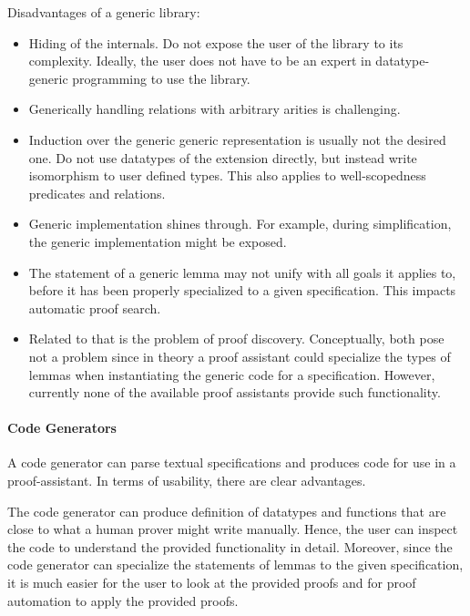 Disadvantages of a generic library:
\begin{itemize}
\item Hiding of the internals. Do not expose the user of the library
  to its complexity. Ideally, the user does not have to be an expert
  in datatype-generic programming to use the library.

\item Generically handling relations with arbitrary arities is challenging.

\item Induction over the generic generic representation is usually not the
  desired one. Do not use datatypes of the extension directly, but instead write
  isomorphism to user defined types. This also applies to well-scopedness
  predicates and relations.

\item Generic implementation shines through. For example, during
  simplification, the generic implementation might be exposed.

\item The statement of a generic lemma may not unify with all goals it applies
  to, before it has been properly specialized to a given specification. This
  impacts automatic proof search.

\item Related to that is the problem of proof discovery. Conceptually, both pose
  not a problem since in theory a proof assistant could specialize the types of
  lemmas when instantiating the generic code for a specification. However,
  currently none of the available proof assistants provide such functionality.
\end{itemize}


\paragraph{Code Generators}
A code generator can parse textual \Knot specifications and produces code for
use in a proof-assistant. In terms of usability, there are clear advantages.

The code generator can produce definition of datatypes and functions that are
close to what a human prover might write manually. Hence, the user can inspect
the code to understand the provided functionality in detail. Moreover, since the
code generator can specialize the statements of lemmas to the given
specification, it is much easier for the user to look at the provided proofs
and for proof automation to apply the provided proofs.

